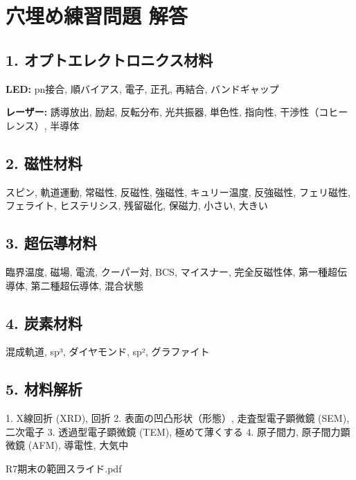 \documentclass[11pt,a4paper]{ltjsarticle}
\begin{document}
\clearpage
\section{穴埋め練習問題 解答}

\subsection*{1. オプトエレクトロニクス材料}
\textbf{LED:} pn接合, 順バイアス, 電子, 正孔, 再結合, バンドギャップ

\textbf{レーザー:} 誘導放出, 励起, 反転分布, 光共振器, 単色性, 指向性, 干渉性（コヒーレンス）, 半導体

\subsection*{2. 磁性材料}
スピン, 軌道運動, 常磁性, 反磁性, 強磁性, キュリー温度, 反強磁性, フェリ磁性, フェライト, ヒステリシス, 残留磁化, 保磁力, 小さい, 大きい

\subsection*{3. 超伝導材料}
臨界温度, 磁場, 電流, クーパー対, BCS, マイスナー, 完全反磁性体, 第一種超伝導体, 第二種超伝導体, 混合状態

\subsection*{4. 炭素材料}
混成軌道, sp³, ダイヤモンド, sp², グラファイト

\subsection*{5. 材料解析}
1. X線回折 (XRD), 回折
2. 表面の凹凸形状（形態）, 走査型電子顕微鏡 (SEM), 二次電子
3. 透過型電子顕微鏡 (TEM), 極めて薄くする
4. 原子間力, 原子間力顕微鏡 (AFM), 導電性, 大気中

\begin{thebibliography}{9}
 R7期末の範囲スライド.pdf
\end{thebibliography}
\end{document}
